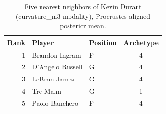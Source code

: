 \begin{table}[htbp]
  \centering\small
  \begin{tabular}{rllc}
    \toprule
    Rank & Player & Position & Archetype \\
    \midrule
    1 & Brandon Ingram & F & 4 \\
    2 & D'Angelo Russell & G & 4 \\
    3 & LeBron James & G & 4 \\
    4 & Tre Mann & G & 1 \\
    5 & Paolo Banchero & F & 4 \\
    \bottomrule
  \end{tabular}
  \caption{Five nearest neighbors of Kevin Durant (curvature_m3 modality), Procrustes-aligned posterior mean.}
  \label{tab:Kevin_Durant_neighbors_curvature_m3}
\end{table}

